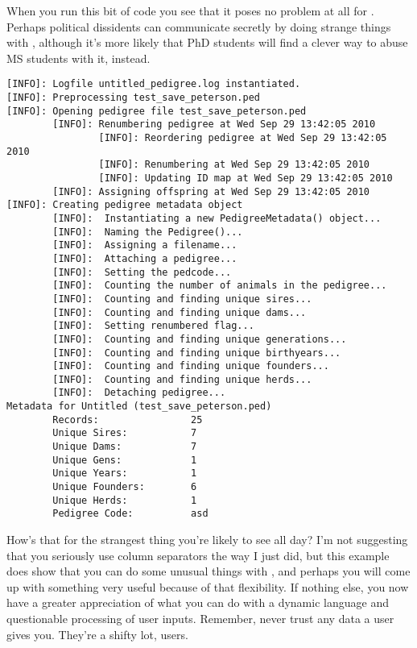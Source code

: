 When you run this bit of code you see that it poses no problem at all for \PyPedal{}. Perhaps political dissidents can communicate secretly by doing strange things
with , although it's more likely that PhD students will find a clever way to abuse MS students with it, instead.
\begin{verbatim}
[INFO]: Logfile untitled_pedigree.log instantiated.
[INFO]: Preprocessing test_save_peterson.ped
[INFO]: Opening pedigree file test_save_peterson.ped
        [INFO]: Renumbering pedigree at Wed Sep 29 13:42:05 2010
                [INFO]: Reordering pedigree at Wed Sep 29 13:42:05 2010
                [INFO]: Renumbering at Wed Sep 29 13:42:05 2010
                [INFO]: Updating ID map at Wed Sep 29 13:42:05 2010
        [INFO]: Assigning offspring at Wed Sep 29 13:42:05 2010
[INFO]: Creating pedigree metadata object
        [INFO]:  Instantiating a new PedigreeMetadata() object...
        [INFO]:  Naming the Pedigree()...
        [INFO]:  Assigning a filename...
        [INFO]:  Attaching a pedigree...
        [INFO]:  Setting the pedcode...
        [INFO]:  Counting the number of animals in the pedigree...
        [INFO]:  Counting and finding unique sires...
        [INFO]:  Counting and finding unique dams...
        [INFO]:  Setting renumbered flag...
        [INFO]:  Counting and finding unique generations...
        [INFO]:  Counting and finding unique birthyears...
        [INFO]:  Counting and finding unique founders...
        [INFO]:  Counting and finding unique herds...
        [INFO]:  Detaching pedigree...
Metadata for Untitled (test_save_peterson.ped)
        Records:                25
        Unique Sires:           7
        Unique Dams:            7
        Unique Gens:            1
        Unique Years:           1
        Unique Founders:        6
        Unique Herds:           1
        Pedigree Code:          asd
\end{verbatim}
How's that for the strangest thing you're likely to see all day? I'm not suggesting that you seriously use column separators the way I just did, but this
example does show that you can do some unusual things with \PyPedal{}, and perhaps you will come up with something very useful because of that flexibility.
If nothing else, you now have a greater appreciation of what you can do with a dynamic language and questionable processing of user inputs. Remember, never
trust any data a user gives you. They're a shifty lot, users.

